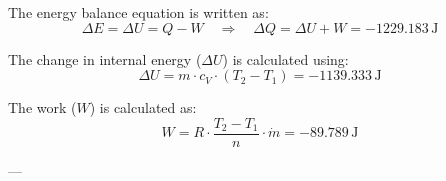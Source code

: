 The energy balance equation is written as:  
\[
\Delta E = \Delta U = Q - W \quad \Rightarrow \quad \Delta Q = \Delta U + W = -1229.183 \, \text{J}
\]  

The change in internal energy (\( \Delta U \)) is calculated using:  
\[
\Delta U = m \cdot c_V \cdot (T_2 - T_1) = -1139.333 \, \text{J}
\]  

The work (\( W \)) is calculated as:  
\[
W = R \cdot \frac{T_2 - T_1}{n} \cdot \dot{m} = -89.789 \, \text{J}
\]  

---